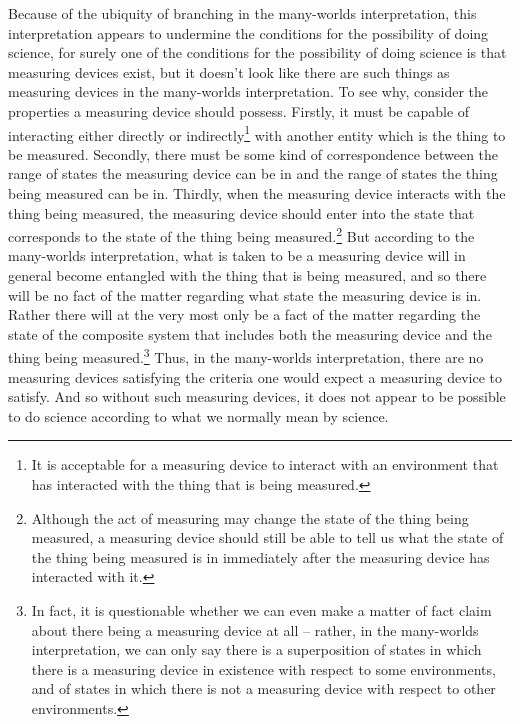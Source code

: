       Because of the ubiquity of branching in the many-worlds interpretation, this interpretation appears to undermine the conditions for the possibility of doing science, for surely one of the conditions for the possibility of doing science is that measuring devices exist, but it doesn't look like there are such things as measuring devices in the many-worlds interpretation. To see why, consider the properties a measuring device should possess. Firstly, it must be capable of interacting either directly or indirectly\footnote{It is acceptable for a measuring device to interact with an environment that has interacted with the thing that is being measured.} with another entity which is the thing to be measured. Secondly, there must be some kind of correspondence between the range of states the measuring device can be in and the range of states the thing being measured can be in. Thirdly, when the measuring device interacts with the thing being measured, the measuring device should enter into the state that corresponds to the state of the thing being measured.\footnote{Although the act of measuring may change the state of the thing being measured, a measuring device should still be able to tell us what the state of the thing being measured is in immediately after the measuring device has interacted with it.} But according to the many-worlds interpretation, what is taken to be a measuring device will  in general become entangled with the thing  that is being measured,  and so there will be no fact of the matter regarding what state the measuring device is in. Rather there will at the very most only be a fact of the matter regarding the state of the composite system that includes both the measuring device and the thing being measured.\footnote{In fact, it is questionable whether we can even make a matter of fact claim about there being a measuring device at all -- rather, in the many-worlds interpretation, we can only say there is a superposition of states in which there is a measuring device in existence with respect to some environments, and of states in which there is not a measuring device with respect to other environments.  } Thus, in the many-worlds interpretation, there are no measuring devices satisfying the criteria one would expect a measuring device to satisfy. And so without such measuring devices, it does not appear to be possible to do science according to what we normally mean by science.  

